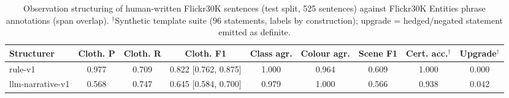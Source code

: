 \begin{table}[!t]
\centering
\scriptsize
\caption{Observation structuring of human-written Flickr30K sentences (test split, 525 sentences) against Flickr30K Entities phrase annotations (span overlap). $^\dagger$Synthetic template suite (96 statements, labels by construction); upgrade = hedged/negated statement emitted as definite.}
\label{tab:exp4}
\begin{adjustbox}{max width=\textwidth}
\begin{tabular}{lcccccccc}
\toprule
Structurer & Cloth. P & Cloth. R & Cloth. F1 & Class agr. & Colour agr. & Scene F1 & Cert. acc.$^\dagger$ & Upgrade$^\dagger$ \\
\midrule
rule-v1 & 0.977 & 0.709 & 0.822 [0.762, 0.875] & 1.000 & 0.964 & 0.609 & 1.000 & 0.000 \\
llm-narrative-v1 & 0.568 & 0.747 & 0.645 [0.584, 0.700] & 0.979 & 1.000 & 0.566 & 0.938 & 0.042 \\
\bottomrule
\end{tabular}
\end{adjustbox}
\end{table}
